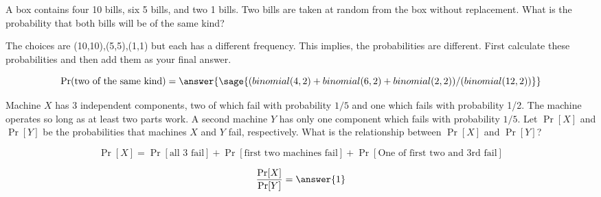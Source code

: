 \documentclass{ximera}
\begin{document}
\begin{problem}
A box contains four 10 bills, six 5 bills, and two 1 bills. Two bills are taken at random from the box without replacement. What is the probability that both bills will be of the same kind? 
\begin{hint}
The choices are (10,10),(5,5),(1,1) but each has a different frequency. This implies, the probabilities are different. First calculate these probabilities and then add them as your final answer.
\end{hint}



\begin{prompt}
$$ 
\Pr(\text{two of the same kind}) =\answer{\sage{(binomial(4,2)+binomial(6,2)+binomial(2,2))/(binomial(12,2))}}
$$
\end{prompt}
\end{problem}


\begin{problem}
Machine $X$ has 3 independent components, two of which fail with probability $1/5$ and one which fails with probability 1/2. The machine operates so long as at least two parts work. A second machine $Y$ has only one component which fails with probability $1/5$. Let $\Pr[X]$ and $\Pr[Y]$ be the probabilities that machines $X$ and $Y$ fail, respectively. What is the relationship between $\Pr[X]$ and $\Pr[Y]$? 

\begin{hint}
$$
\Pr[X]=\Pr[\text{all 3 fail}]+\Pr[\text{first two machines fail}]+\Pr[\text{One of first two and 3rd fail}] 
$$
\end{hint}

\begin{prompt}
        $$\frac{\Pr[X]}{\Pr[Y]}=\answer{1} $$
\end{prompt}
\end{problem}
\end{document}
